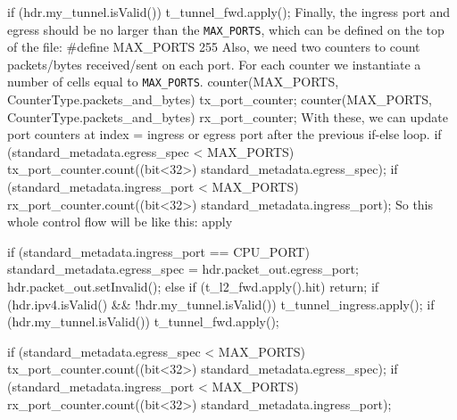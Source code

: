 \documentclass{article}%
\newenvironment{code}%
   {\snugshade\verbatim}%
   {\endverbatim\endsnugshade}
\begin{document}
\begin{Large}
\begin{code}
{        if (hdr.my_tunnel.isValid()) {
            t_tunnel_fwd.apply();
        }
    }
\end{code}
Finally, the ingress port and egress should be no larger than the \texttt{MAX\_PORTS}, which can be defined on the top of the file:
\begin{code}
    #define MAX_PORTS 255
\end{code}
Also, we need two counters to count packets/bytes received/sent on each port. For each counter we instantiate a number of cells equal to \texttt{MAX\_PORTS}.
\begin{code}
    counter(MAX_PORTS, CounterType.packets_and_bytes) 
        tx_port_counter;
    counter(MAX_PORTS, CounterType.packets_and_bytes) 
        rx_port_counter;
\end{code}
\newpage
With these, we can update port counters at index = ingress or egress port after the previous if-else loop.
\begin{code}
    if (standard_metadata.egress_spec < MAX_PORTS) {
        tx_port_counter.count((bit<32>) 
            standard_metadata.egress_spec);
    }
    if (standard_metadata.ingress_port < MAX_PORTS) {
        rx_port_counter.count((bit<32>) 
            standard_metadata.ingress_port);
    }
\end{code}
So this whole control flow will be like this:
\begin{code}
    apply {
        if (standard_metadata.ingress_port == CPU_PORT) {
            standard_metadata.egress_spec = 
                hdr.packet_out.egress_port;
            hdr.packet_out.setInvalid();
        } else {
            if (t_l2_fwd.apply().hit) return;
            if (hdr.ipv4.isValid() && !hdr.my_tunnel.isValid()) {
                t_tunnel_ingress.apply();
            }
            if (hdr.my_tunnel.isValid()) t_tunnel_fwd.apply();
        }

        if (standard_metadata.egress_spec < MAX_PORTS) {
            tx_port_counter.count((bit<32>) 
                standard_metadata.egress_spec);
        }
        if (standard_metadata.ingress_port < MAX_PORTS) {
            rx_port_counter.count((bit<32>) 
                standard_metadata.ingress_port);
        }
    }
\end{code}
\newpage



\end{Large}
\end{document}
